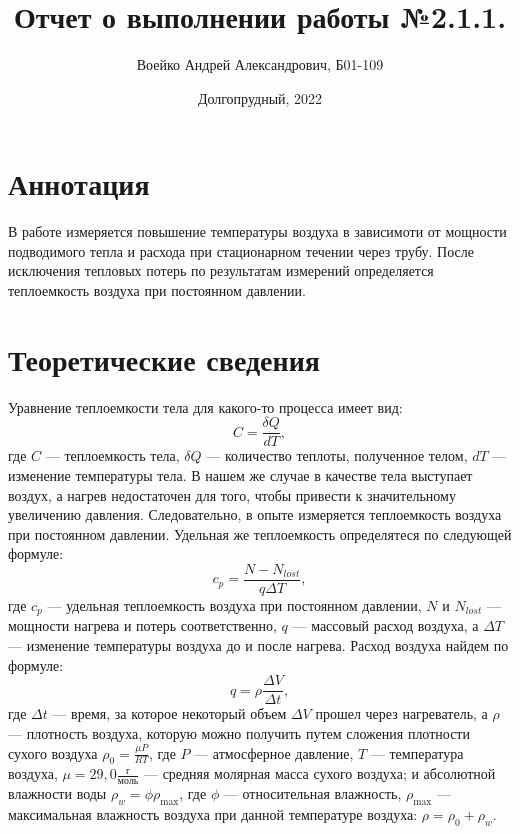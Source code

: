 \documentclass[a4paper,11pt]{article}
\title{Отчет о выполнении работы №2.1.1.}
\author{Воейко Андрей Александрович, Б01-109}
\date{Долгопрудный, 2022}
\begin{document}
\maketitle
\newpage
\section{Аннотация}
В работе измеряется повышение температуры воздуха в зависимоти от мощности подводимого тепла и расхода при стационарном течении через трубу. После исключения тепловых потерь по результатам измерений определяется теплоемкость воздуха при постоянном давлении.
\section{Теоретические сведения}
Уравнение теплоемкости тела для какого-то процесса имеет вид:
\begin{equation}    \label{eq1}
C = \frac{\delta Q}{dT},
\end{equation}
где $C$ — теплоемкость тела, $\delta Q$ — количество теплоты, полученное телом, $dT$ — изменение температуры тела.
В нашем же случае в качестве тела выступает воздух, а нагрев недостаточен для того, чтобы привести к значительному увеличению давления. Следовательно, в опыте измеряется теплоемкость воздуха при постоянном давлении.
\newline
Удельная же теплоемкость определятеся по следующей формуле:
\begin{equation}    \label{eq2}
c_{p} = \frac{N - N_{lost}}{q \Delta T},
\end{equation}
где $c_{p}$ — удельная теплоемкость воздуха при постоянном давлении, $N$ и $N_{lost}$ — мощности нагрева и потерь соответственно, $q$ — массовый расход воздуха, а $\Delta T$ — изменение температуры воздуха до и после нагрева.
\newline
Расход воздуха найдем по формуле:
\begin{equation}    \label{eq3}
q = \rho \frac{\Delta V}{\Delta t},
\end{equation}
где $\Delta t$ — время, за которое некоторый объем $\Delta V$ прошел через нагреватель, а $\rho$ — плотность воздуха, которую можно получить путем сложения плотности сухого воздуха $\rho _{0} = \frac{\mu P}{RT}$, где $P$ — атмосферное давление, $T$ — температура воздуха, $\mu = 29,0 \frac{г}{моль}$ — средняя молярная масса сухого воздуха; и абсолютной влажности воды $\rho _{w} = \phi \rho _{\max}$, где $\phi$ — относительная влажность, $\rho _{\max}$ — максимальная влажность воздуха при данной температуре воздуха: $\rho = \rho _{0} + \rho _{w}$.
\end{document}
